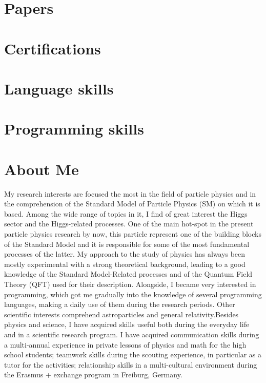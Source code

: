 \documentclass[11pt,a4paper,roman]{moderncv}        %
\begin{document}
\section{Papers}
\section{Certifications}

\section{Language skills}

\section{Programming skills}

\section{About Me}
My research interests are focused the most in the field of particle physics and in the comprehension of the Standard Model of Particle Physics (SM) on which it is based. Among the wide range of topics in it, I find of great interest the Higgs sector and the Higgs-related processes. One of the main hot-spot in the present particle physics research by now, this particle represent one of the building blocks of the Standard Model and it is responsible for some of the most fundamental processes of the latter. My approach to the study of physics has always been mostly experimental with a strong theoretical background, leading to a good knowledge of the Standard Model-Related processes and of the Quantum Field Theory (QFT) used for their description. Alongside, I became very interested in programming, which got me gradually into the knowledge of several programming languages, making a daily use of them during the research periods. Other scientific interests comprehend astroparticles and general relativity.Besides physics and science, I have acquired skills useful both during the everyday life and in a scientific research program. I have acquired communication skills during a multi-annual experience in private lessons of physics and math for the high school students; teamwork skills during the scouting experience, in particular as a tutor for the activities; relationship skills in a multi-cultural environment during the Erasmus + exchange program in Freiburg, Germany.
\end{document}
